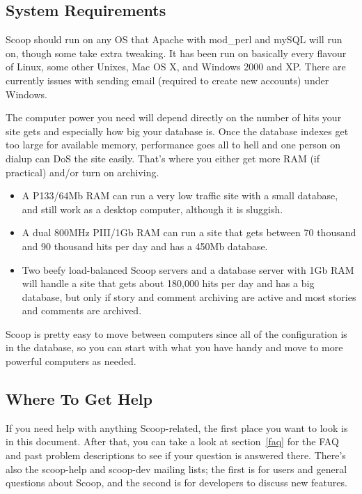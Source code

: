 \subsection{System Requirements}

Scoop should run on any OS that Apache with mod\_perl and mySQL will run on, though some take extra tweaking.  It has been run on basically every flavour of Linux, some other Unixes, Mac OS X, and Windows 2000 and XP.  There are currently issues with sending email (required to create new accounts) under Windows.

The computer power you need will depend directly on the number of hits your site gets and especially how big your database is.  Once the database indexes get too large for available memory, performance goes all to hell and one person on dialup can DoS the site easily.  That's where you either get more RAM (if practical) and/or turn on archiving.

\begin{itemize}
\item A P133/64Mb RAM can run a very low traffic site with a small database, and still work as a desktop computer, although it is sluggish.
\item A dual 800MHz PIII/1Gb RAM can run a site that gets between 70 thousand and 90 thousand hits per day and has a 450Mb database.
\item Two beefy load-balanced Scoop servers and a database server with 1Gb RAM will handle a site that gets about 180,000 hits per day and has a big database, but only if story and comment archiving are active and most stories and comments are archived.
\end{itemize}

Scoop is pretty easy to move between computers since all of the configuration is in the database, so you can start with what you have handy and move to more powerful computers as needed.

\subsection{Where To Get Help}
\label{get-help}

If you need help with anything Scoop-related, the first place you want to look is in this document.  After that, you can take a look at section~\ref{faq} for the FAQ and past problem descriptions to see if your question is answered there.  There's also the scoop-help and scoop-dev mailing lists; the first is for users and general questions about Scoop, and the second is for developers to discuss new features.


